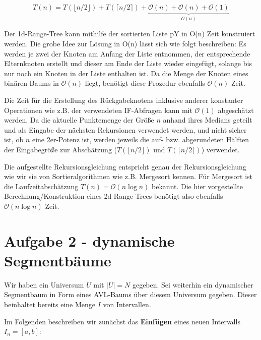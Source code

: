 \documentclass[a4paper]{article}
\begin{document}
$$T(n) = T(\lfloor n/2\rfloor) + T(\lceil n/2\rceil) + \underbrace{\mathcal{O}(n) + \mathcal{O}(n) + \mathcal{O}(1)}_{\mathcal{O}(n)}$$

Der 1d-Range-Tree kann mithilfe der 
sortierten Liste pY in O(n) Zeit konstruiert werden. Die grobe Idee zur Lösung in O(n) lässt sich 
wie folgt beschreiben: Es werden je zwei der Knoten am Anfang der Liste entnommen, der entsprechende
Elternknoten erstellt und dieser am Ende der Liste wieder eingefügt, solange bis nur noch ein Knoten
in der Liste enthalten ist. Da die Menge der Knoten eines binären Baums in $\mathcal{O}(n)$ liegt, 
benötigt diese Prozedur ebenfalls $\mathcal{O}(n)$ Zeit. 

 Die Zeit für die Erstellung des Rückgabeknotens inklusive anderer
konstanter Operationen wie z.B. der verwendeten IF-Abfragen kann mit $\mathcal{O}(1)$ abgeschätzt
werden. Da die aktuelle Punktemenge der Größe $n$ anhand ihres Medians geteilt und als Eingabe der
nächsten Rekursionen verwendet werden, und nicht sicher ist, ob $n$ eine 2er-Potenz ist, werden
jeweils die auf- bzw. abgerundeten Hälften der Eingabegröße zur Abschätzung ($T(\lfloor n/2\rfloor)$  und $T(\lceil n/2\rceil)$) verwendet. 

Die aufgestellte Rekursionsgleichung entspricht genau der Rekursionsgleichung wie wir sie von Sortieralgorithmen wie z.B. Mergesort kennen. Für Mergesort ist die Laufzeitabschätzung 
$T(n) = \mathcal{O}(n \log n)$ bekannt. Die hier vorgestellte Berechnung/Konstruktion eines
2d-Range-Trees benötigt also ebenfalls $\mathcal{O}(n \log n)$ Zeit.

\section*{Aufgabe 2 - dynamische Segmentbäume}
Wir haben ein Universum $U$ mit $|U| = N$ gegeben. Sei weiterhin ein dynamischer Segmentbaum in Form eines AVL-Baums über diesem Universum gegeben. Dieser beinhaltet bereits eine Menge $I$ von Intervallen. 

Im Folgenden beschreiben wir zunächst das \textbf{Einfügen} eines neuen Intervalls $I_n = [a,b]$:
\end{document}

